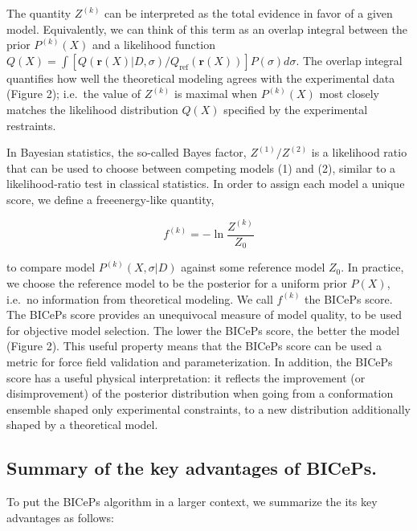 \documentclass[11pt]{article}
\begin{document}
The quantity \(Z^{(k)}\) can be interpreted as the total evidence in
favor of a given model. Equivalently, we can think of this term as an
overlap integral between the prior \(P^{(k)}(X)\) and a likelihood
function
\(Q(X) = \int [Q(\mathbf{r}(X)|D,\sigma)/Q_{\text{ref}}(\mathbf{r}(X)) ] P(\sigma) d\sigma\).
The overlap integral quantifies how well the theoretical modeling agrees
with the experimental data (Figure 2); i.e.~the value of \(Z^{(k)}\) is
maximal when \(P^{(k)}(X)\) most closely matches the likelihood
distribution \(Q(X)\) specified by the experimental restraints.

In Bayesian statistics, the so-called Bayes factor, \(Z^{(1)}/Z^{(2)}\)
is a likelihood ratio that can be used to choose between competing
models (1) and (2), similar to a likelihood-ratio test in classical
statistics. In order to assign each model a unique score, we define a
freeenergy-like quantity,

\[f^{(k)} = -\ln \frac{Z^{(k)}}{Z_0}\tag{5}\]

to compare model \(P^{(k)}(X,\sigma|D)\) against some reference model
\(Z_0\). In practice, we choose the reference model to be the posterior
for a uniform prior \(P(X)\), i.e.~no information from theoretical
modeling. We call \(f^{(k)}\) the BICePs score. The BICePs score
provides an unequivocal measure of model quality, to be used for
objective model selection. The lower the BICePs score, the better the
model (Figure 2). This useful property means that the BICePs score can
be used a metric for force field validation and parameterization. In
addition, the BICePs score has a useful physical interpretation: it
reflects the improvement (or disimprovement) of the posterior
distribution when going from a conformation ensemble shaped only
experimental constraints, to a new distribution additionally shaped by a
theoretical model.

\hypertarget{summary-of-the-key-advantages-of-biceps.}{%
\subsection{Summary of the key advantages of
BICePs.}\label{summary-of-the-key-advantages-of-biceps.}}

To put the BICePs algorithm in a larger context, we summarize the its
key advantages as follows:
\end{document}
